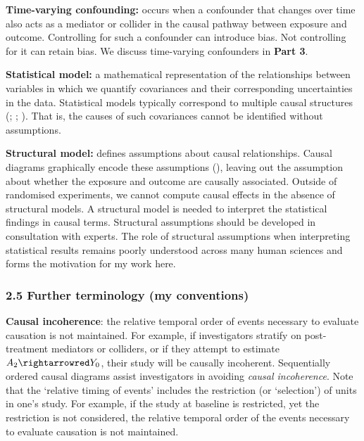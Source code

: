 \documentclass[
  singlecolumn]{article}
\begin{document}
\textbf{Time-varying confounding:} occurs when a confounder that changes
over time also acts as a mediator or collider in the causal pathway
between exposure and outcome. Controlling for such a confounder can
introduce bias. Not controlling for it can retain bias. We discuss
time-varying confounders in \textbf{Part 3}.

\textbf{Statistical model:} a mathematical representation of the
relationships between variables in which we quantify covariances and
their corresponding uncertainties in the data. Statistical models
typically correspond to multiple causal structures
(;
;
).
That is, the causes of such covariances cannot be identified without
assumptions.

\textbf{Structural model:} defines assumptions about causal
relationships. Causal diagrams graphically encode these assumptions
(), leaving out the
assumption about whether the exposure and outcome are causally
associated. Outside of randomised experiments, we cannot compute causal
effects in the absence of structural models. A structural model is
needed to interpret the statistical findings in causal terms. Structural
assumptions should be developed in consultation with experts. The role
of structural assumptions when interpreting statistical results remains
poorly understood across many human sciences and forms the motivation
for my work here.

\subsubsection{2.5 Further terminology (my
conventions)}\label{further-terminology-my-conventions}

\textbf{Causal incoherence}: the relative temporal order of events
necessary to evaluate causation is not maintained. For example, if
investigators stratify on post-treatment mediators or colliders, or if
they attempt to estimate \(A_2 \rightarrowred Y_0\), their study will be
causally incoherent. Sequentially ordered causal diagrams assist
investigators in avoiding \emph{causal incoherence}. Note that the
`relative timing of events' includes the restriction (or `selection') of
units in one's study. For example, if the study at baseline is
restricted, yet the restriction is not considered, the relative temporal
order of the events necessary to evaluate causation is not maintained.
\end{document}
